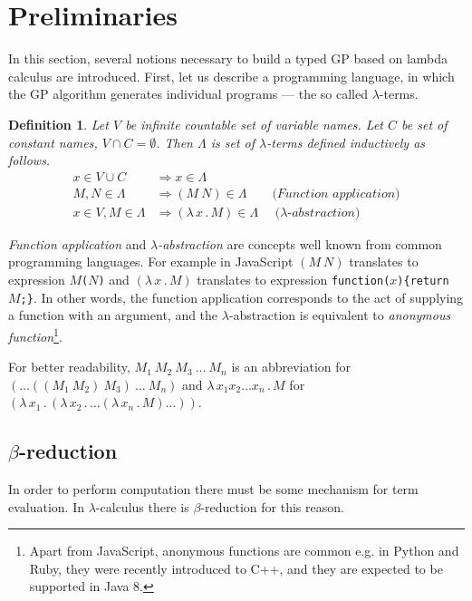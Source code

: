 \documentclass{sig-alternate}
\newtheorem{definition}{Definition}
\newcommand{\lets}{let us\xspace}
\newcommand{\lterms}{$\lambda$-terms\xspace}
\newcommand{\then}{\Rightarrow\xspace}
\newcommand{\lamb}[2]{( \lambda \, #1 \, . \, #2 )}
\newcommand{\lam}[2]{\lambda \, #1 \, . \, #2}
\begin{document}
\section{Preliminaries}
\label{preliminaries}

In this section, several notions necessary to build a typed GP based on lambda calculus are introduced. 
First, \lets describe a programming language, 
in which the GP algorithm generates individual programs --- the so called \lterms.

\begin{definition}
Let $V$ be infinite countable set of {\it 
variable names}. Let $C$ be set of {\it constant names}, 
$V \cap C = \emptyset$.	 	
Then $\Lambda$ is set of {\it \lterms} defined inductively as follows.	
\begin{align*}
x   \in V \cup C  &\then x     \in \Lambda \\
M,N \in \Lambda   &\then (M~N) \in \Lambda 
\textit{~~~~~~(Function application)} \\
x   \in V , M \in \Lambda &\then \lamb{x}{M} \in \Lambda
\textit{~~~~($\lambda$-abstraction)} 
\end{align*}
\end{definition}


\textit{Function application} and 
\textit{$\lambda$-abstraction} are concepts
well known from common programming languages. 
For example in JavaScript 
$(M~N)$ translates to expression \texttt{$M$($N$)} and
$\lamb{x}{M}$ translates to expression \texttt{function($x$)\{return $M$;\}}.
In other words, the function application 
corresponds to the act of supplying a function 
with an argument, and
the $\lambda$-abstraction is equivalent to 
\textit{anonymous function}\footnote{Apart from JavaScript, anonymous functions are common e.g. in Python and Ruby, 
they were recently introduced to C++, and they are expected to be supported in Java 8.}.

For better readability, 
$M_1~M_2~M_3~\dots~M_n$ is an abbreviation for
$(\dots((M_1~M_2)~M_3)~\dots~M_n)$
and $\lam{x_1 x_2 \dots x_n }{M}$ for 
$\lamb{x_1}{\lamb{x_2}{\dots\lamb{x_n}{M}\dots}}$.


\subsection{$\beta$-reduction}

In order to perform computation there must be some
mechanism for term evaluation. In $\lambda$-calculus there
is $\beta$-reduction for this reason.\\
\end{document}
